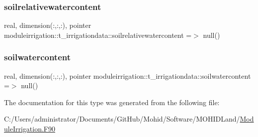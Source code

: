 \subsubsection{\texorpdfstring{soilrelativewatercontent}{soilrelativewatercontent}}
{\footnotesize\ttfamily real, dimension(\+:,\+:,\+:), pointer moduleirrigation\+::t\+\_\+irrigationdata\+::soilrelativewatercontent =$>$ null()\hspace{0.3cm}{\ttfamily [private]}}

\mbox{\label{structmoduleirrigation_1_1t__irrigationdata_ae10e22500a153a67905ba20f886b4389}} 
\subsubsection{\texorpdfstring{soilwatercontent}{soilwatercontent}}
{\footnotesize\ttfamily real, dimension(\+:,\+:,\+:), pointer moduleirrigation\+::t\+\_\+irrigationdata\+::soilwatercontent =$>$ null()\hspace{0.3cm}{\ttfamily [private]}}



The documentation for this type was generated from the following file\+:\begin{DoxyCompactItemize}
\item 
C\+:/\+Users/administrator/\+Documents/\+Git\+Hub/\+Mohid/\+Software/\+M\+O\+H\+I\+D\+Land/\mbox{\hyperlink{_module_irrigation_8_f90}{Module\+Irrigation.\+F90}}\end{DoxyCompactItemize}
